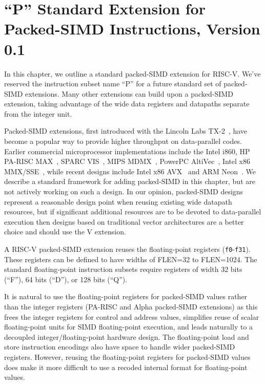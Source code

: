 \chapter{``P'' Standard Extension for Packed-SIMD Instructions,
  Version 0.1}
\label{sec:packedsimd}

In this chapter, we outline a standard packed-SIMD extension for
RISC-V.  We've reserved the instruction subset name ``P'' for a future
standard set of packed-SIMD extensions.  Many other extensions can
build upon a packed-SIMD extension, taking advantage of the wide data
registers and datapaths separate from the integer unit.

\begin{commentary}
Packed-SIMD extensions, first introduced with the Lincoln Labs TX-2~\cite{tx2},
have become a popular way to provide higher throughput on data-parallel
codes. Earlier commercial microprocessor implementations include the
Intel i860, HP PA-RISC MAX~\cite{lee-max-ieeemicro1996}, SPARC
VIS~\cite{tremblay-vis-ieeemicro1996}, MIPS
MDMX~\cite{gwennap-mdmx-mpr1996}, PowerPC
AltiVec~\cite{diefendorff-altivec-ieeemicro2000}, Intel x86
MMX/SSE~\cite{peleg-mmx-ieeemicro1996, raman-sse-ieeemicro2000}, while
recent designs include Intel x86 AVX~\cite{lomont-avx-irm2011} and ARM
Neon~\cite{goodacre-armisa-computer2005}.  We describe a standard
framework for adding packed-SIMD in this chapter, but are not actively
working on such a design.  In our opinion, packed-SIMD designs represent
a reasonable design point when reusing existing wide datapath resources,
but if significant additional resources are to be devoted to
data-parallel execution then designs based on traditional vector
architectures are a better choice and should use the V extension.

\end{commentary}

A RISC-V packed-SIMD extension reuses the floating-point registers
({\tt f0}-{\tt f31}).  These registers can be defined to have widths
of FLEN=32 to FLEN=1024.  The standard floating-point instruction
subsets require registers of width 32 bits (``F''), 64 bits (``D''),
or 128 bits (``Q'').

\begin{commentary}
It is natural to use the floating-point registers for packed-SIMD
values rather than the integer registers (PA-RISC and Alpha
packed-SIMD extensions) as this frees the integer registers for
control and address values, simplifies reuse of scalar floating-point
units for SIMD floating-point execution, and leads naturally to a
decoupled integer/floating-point hardware design.  The floating-point
load and store instruction encodings also have space to handle wider
packed-SIMD registers.  However, reusing the floating-point registers
for packed-SIMD values does make it more difficult to use a recoded
internal format for floating-point values.
\end{commentary}

